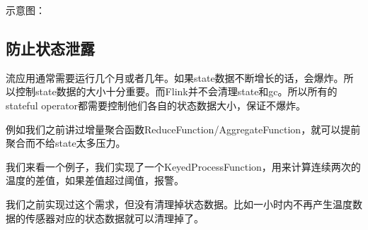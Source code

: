 \documentclass[oneside]{ctexbook}
\begin{document}
示意图：

\subsection{防止状态泄露}

流应用通常需要运行几个月或者几年。如果state数据不断增长的话，会爆炸。所以控制state数据的大小十分重要。而Flink并不会清理state和gc。所以所有的stateful operator都需要控制他们各自的状态数据大小，保证不爆炸。

例如我们之前讲过增量聚合函数ReduceFunction/AggregateFunction，就可以提前聚合而不给state太多压力。

我们来看一个例子，我们实现了一个KeyedProcessFunction，用来计算连续两次的温度的差值，如果差值超过阈值，报警。

我们之前实现过这个需求，但没有清理掉状态数据。比如一小时内不再产生温度数据的传感器对应的状态数据就可以清理掉了。
\end{document}
